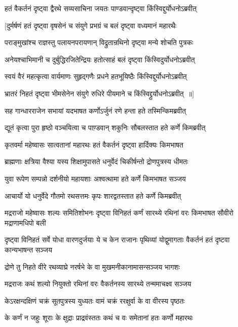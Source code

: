 \twolineshloka
{हतं वैकर्तनं दृष्ट्वा द्वैरथे सव्यसाचिना}
{जयतः पाण्डवान्दृष्ट्वा किंस्विद्दुर्योधनोऽब्रवीत्}


\twolineshloka
{[दुर्मर्षणं हतं दृष्ट्वा वृषसेनं च संयुगे}
{प्रभग्रं च बलं दृष्ट्वा वध्यमानं महारथैः}


\twolineshloka
{पराङ्मुखांश्च राज्ञस्तु पलायनपरायणान्}
{विद्रुतान्रथिनो दृष्ट्वा मन्ये शोचति पुत्रकः}


\twolineshloka
{अनेयश्चाभिमानी च दुर्बुद्धिरजितेन्द्रियः}
{हतोत्साहं बलं दृष्ट्वा किंस्विदुर्योधनोऽब्रवीत्}


\twolineshloka
{स्वयं वैरं महत्कृत्वा वार्यमाणः सुहृद्गणैः}
{प्रधने हतभूयिष्ठैः किंस्विद्दुर्योधनोऽब्रवीत्}


\twolineshloka
{भ्रातरं निहतं दृष्ट्वा भीमसेनेन संयुगे}
{रुधिरे पीयमाने च किंस्विद्द्रुर्योधनोऽब्रवीत् ॥]}


\twolineshloka
{सह गान्धारराजेन सभायां यदभाषत}
{कर्णोऽर्जुनं रणे हन्ता हते तस्मिन्किमब्रवीत्}


\twolineshloka
{द्यूतं कृत्वा पुरा हृष्ठो वञ्चयित्वा च पाण़्डवान्}
{शकुनिः सौबलस्तात हते कर्णे किमब्रवीत्}


\twolineshloka
{कृतवर्मा महेष्वासः सात्वतानां महारथः}
{हतं वैकर्तनं दृष्ट्वा हार्दिक्यः किमभाषत}


\twolineshloka
{ब्राह्मणाः क्षत्रिया वैश्या यस्य शिक्षामुपासते}
{धनुर्वेदं चिकीर्षन्तो द्रोणपुत्रस्य धीमतः}


\twolineshloka
{युवा रूपेण सम्पन्नो दर्शनीयो महायशाः}
{अश्वत्थामा हते कर्णे किमभाषत सञ्जय}


\twolineshloka
{आचार्यो यो धनुर्वेदे गौतमो रथसत्तमः}
{कृपः शारद्वतस्तात हते कर्णे किमब्रवीत्}


\threelineshloka
{मद्रराजो महेष्वासः शल्यः समितिशोभनः}
{दृष्ट्वा विनिहतं कर्णं सारथ्ये रथिनां वरः}
{किमभाषत सौवीरो मद्राणामधिपो बली}


\threelineshloka
{दृष्ट्वा विनिहतं सर्वे योधा वारणदुर्जयाः}
{ये च केन राजानः पृथिव्यां योद्वुमागताः}
{वैकर्तनं हतं दृष्टवा कान्यभाषन्त सञ्जय}


\twolineshloka
{द्रोणे तु निहते वीरे रथव्याघ्रे नरर्षभे}
{के वा मुखमनीकानामासन्सञ्जय भागशः}


\twolineshloka
{मद्रराजः कथं शल्यो नियुक्तो रथिनां वरः}
{वैकर्तनस्य सारथ्ये तन्ममाचक्ष्व सञ्जय}


\twolineshloka
{केऽरक्षन्दक्षिणं चक्रं सूतपुत्रस्य युध्यतः}
{वामं चक्रं ररक्षुर्वा के वा वीरस्य पृष्ठतः}


\twolineshloka
{के कर्णं न जहुः शूराः के क्षुद्राः प्राद्रवंस्ततः}
{कथं च वः समेतानां हतः कर्णो महारथः}


